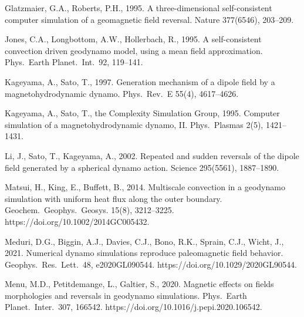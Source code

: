\begin{list}
Glatzmaier, G.A., Roberts, P.H., 1995. A three-dimensional self-consistent computer simulation of a geomagnetic field reversal. Nature 377(6546), 203--209.
%
\item
{\color{teal}
Jones, C.A., Longbottom, A.W., Hollerbach, R., 1995. A self-consistent convection driven geodynamo model, using a mean field approximation. Phys.\ Earth Planet.\ Int.\ 92, 119--141.
}
%
\item
Kageyama, A., Sato, T., 1997. Generation mechanism of a dipole field by a magnetohydrodynamic dynamo. Phys.\ Rev.\ E 55(4), 4617--4626.
%
\item
Kageyama, A., Sato, T., the Complexity Simulation Group, 1995. Computer simulation of a magnetohydrodynamic dynamo, II. Phys.\ Plasmas 2(5), 1421--1431.
%
\item
Li, J., Sato, T., Kageyama, A., 2002. Repeated and sudden reversals of the dipole field generated by a spherical dynamo action. Science 295(5561), 1887--1890.
%
%
\item
Matsui, H., King, E., Buffett, B., 2014. Multiscale convection in a geodynamo simulation with uniform heat flux along the outer boundary. Geochem.\ Geophys.\ Geosys. 15(8), 3212--3225. https://doi.org/10.1002/2014GC005432.
%
%
\item
{\color{teal}
Meduri, D.G., Biggin, A.J., Davies, C.J., Bono, R.K., Sprain, C.J., Wicht, J., 2021. Numerical dynamo simulations reproduce paleomagnetic field behavior. Geophys.\ Res.\ Lett.\ 48, e2020GL090544. https://doi.org/10.1029/2020GL90544.
}
%
\item
{\color{red}
Menu, M.D., Petitdemange, L., Galtier, S., 2020. Magnetic effects on fields morphologies and reversals in geodynamo simulations. Phys.\ Earth Planet.\ Inter.\ 307, 166542. https://doi.org/10.1016/j.pepi.2020.106542.
}
\end{list}
